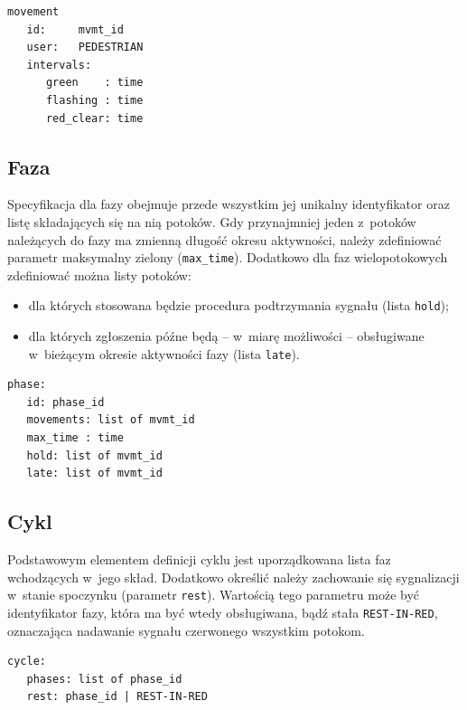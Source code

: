 \documentclass{pracamgr}
\theoremstyle{plain}
\begin{document}
\noindent\begin{minipage}{1.0\linewidth}
\begin{lstlisting}[caption=Schemat opisu dla potoku pieszych.]
movement
   id:     mvmt_id
   user:   PEDESTRIAN
   intervals:
      green    : time
      flashing : time
      red_clear: time
\end{lstlisting}
\end{minipage}

\subsection{Faza} Specyfikacja dla fazy obejmuje przede wszystkim jej
unikalny identyfikator oraz listę składających się na nią potoków.
Gdy przynajmniej jeden z~potoków należących do fazy ma zmienną długość
okresu aktywności, należy zdefiniować parametr maksymalny zielony
(\texttt{max\_time}).  Dodatkowo dla faz wielopotokowych zdefiniować
można listy potoków:
\begin{itemize}
  \item dla których stosowana będzie procedura podtrzymania sygnału
  (lista \texttt{hold});
  \item dla których zgłoszenia późne będą -- w~miarę możliwości --
  obsługiwane w~bieżącym okresie aktywności fazy (lista \texttt{late}).
\end{itemize}
\noindent\begin{minipage}{1.0\linewidth}
\begin{lstlisting}[caption=Schemat opisu fazy.]
phase:
   id: phase_id
   movements: list of mvmt_id
   max_time : time
   hold: list of mvmt_id
   late: list of mvmt_id
\end{lstlisting}
\end{minipage}

\subsection{Cykl} Podstawowym elementem definicji cyklu jest
uporządkowana lista faz wchodzących w~jego skład. Dodatkowo określić
należy zachowanie się sygnalizacji w~stanie spoczynku (parametr
\texttt{rest}). Wartością tego parametru może być identyfikator fazy,
która ma być wtedy obsługiwana, bądź stała \texttt{REST-IN-RED},
oznaczająca nadawanie sygnału czerwonego wszystkim potokom.

\noindent\begin{minipage}{1.0\linewidth}
\begin{lstlisting}[caption=Schemat opisu cyklu.]
cycle:
   phases: list of phase_id
   rest: phase_id | REST-IN-RED
\end{lstlisting}
\end{minipage}
  
\end{document}
